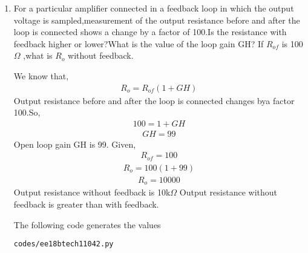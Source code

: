 \begin{enumerate}[label=\thesubsection.\arabic*.,ref=\thesubsection.\theenumi]


\item For a particular amplifier connected in a feedback loop in which the output voltage is sampled,measurement of the output resistance before and after the loop is connected shows a change by a factor of 100.Is the resistance with feedback higher or lower?What is the value of the loop gain GH? If $R_{of}$ is 100 $\Omega$ ,what is $R_o$ without feedback.

\solution
We know that,
\begin{align}
    R_o = R_{of}(1+GH)
    \label{eq:ee18btech11042_1}
\end{align}
Output resistance before and after the loop is connected changes bya factor 100.So,
\begin{align}
    100 = 1+GH
    \label{eq:ee18btech11042_2}
\end{align}
\begin{align}
    GH = 99
\end{align}
Open loop gain GH is  99.
\newline
Given,
\begin{align}
    R_{of} = 100 
    \label{eq:ee18btech11042_3}
\end{align}
\begin{align}
    R_o = 100(1+99)
    \label{eq:ee18btech11042_4}
\end{align}
\begin{align}
    R_o = 10000
    \label{eq:ee18btech11042_5}
\end{align}
Output resistance without feedback  is   10k$\Omega$
\newline
Output resistance without feedback is greater than with feedback.





The following code generates the values
\begin{lstlisting}
codes/ee18btech11042.py
\end{lstlisting}


\end{enumerate}
